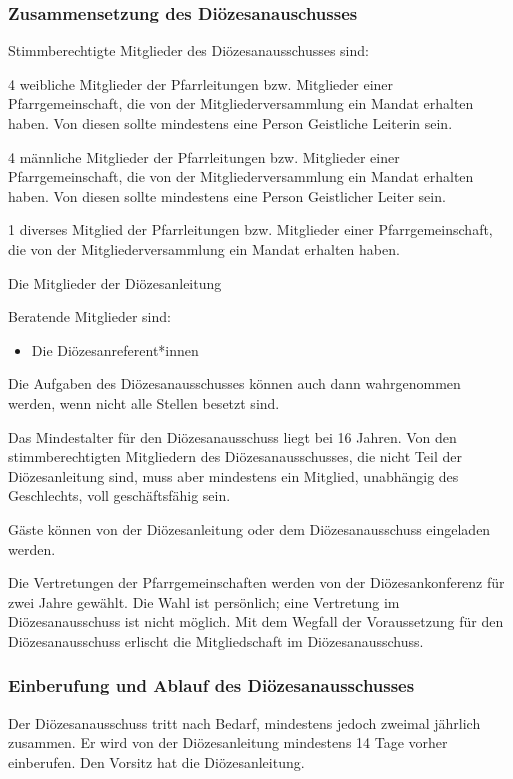 \documentclass[12pt]{report}
\begin{document}
\begin{flushleft}
\subsubsection{Zusammensetzung des Diözesanauschusses}
Stimmberechtigte Mitglieder des Diözesanausschusses sind:
\begin{itemize}
  \item 4 weibliche Mitglieder der Pfarrleitungen bzw. Mitglieder einer Pfarrgemeinschaft, die von der
        Mitgliederversammlung ein Mandat erhalten haben. Von diesen sollte mindestens eine Person
        Geistliche Leiterin sein.
  \item 4 männliche Mitglieder der Pfarrleitungen bzw. Mitglieder einer Pfarrgemeinschaft, die von
        der Mitgliederversammlung ein Mandat erhalten haben. Von diesen sollte mindestens eine
        Person Geistlicher Leiter sein.
  {\color{red}\item 1 diverses Mitglied der Pfarrleitungen bzw. Mitglieder einer Pfarrgemeinschaft, die von
        der Mitgliederversammlung ein Mandat erhalten haben.}
  \item Die Mitglieder der Diözesanleitung
\end{itemize}

Beratende Mitglieder sind:
\begin{itemize}
  \item Die Diözesanreferent*innen
\end{itemize}

Die Aufgaben des Diözesanausschusses können auch dann wahrgenommen werden, wenn nicht
alle Stellen besetzt sind.

Das Mindestalter für den Diözesanausschuss liegt bei 16 Jahren. Von den stimmberechtigten Mitgliedern
des Diözesanausschusses, die nicht Teil der Diözesanleitung sind, muss aber mindestens
ein Mitglied, unabhängig des Geschlechts, voll geschäftsfähig sein.

Gäste können von der Diözesanleitung oder dem Diözesanausschuss eingeladen werden.

Die Vertretungen der Pfarrgemeinschaften werden von der Diözesankonferenz für zwei Jahre
gewählt. Die Wahl ist persönlich; eine Vertretung im Diözesanausschuss ist nicht möglich. Mit
dem Wegfall der Voraussetzung für den Diözesanausschuss erlischt die Mitgliedschaft im Diözesanausschuss.

\subsubsection{Einberufung und Ablauf des Diözesanausschusses}
Der Diözesanausschuss tritt nach Bedarf, mindestens jedoch zweimal jährlich zusammen. Er wird
von der Diözesanleitung mindestens 14 Tage vorher einberufen. Den Vorsitz hat die Diözesanleitung.


\end{flushleft}
\end{document}
